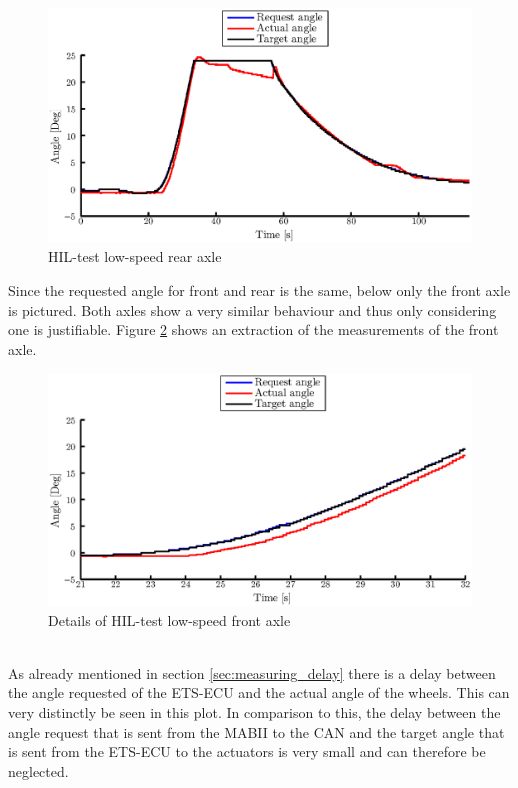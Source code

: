 \documentclass[ExampleMasters.tex]{subfiles}
\begin{document}
\begin{figure}[!htb]
	\centering
	\includegraphics[width=1\linewidth]{figures/HIL002_rear}
	\caption{\acrlong{HIL}-test low-speed rear axle}
	
	\label{fig:HIL002_rear}
\end{figure}
Since the requested angle for front and rear is the same, below only the front axle is pictured. Both axles show a very similar behaviour and thus only considering one is justifiable.
Figure \ref{fig:HIL002_front_closeup} shows an extraction of the measurements of the front axle. 
\begin{figure}[!htb]
	\centering
	\includegraphics[width=1\linewidth]{figures/HIL002_front_closeup}
	\caption{Details of \acrlong{HIL}-test low-speed front axle}
	
	\label{fig:HIL002_front_closeup}
\end{figure} \\
As already mentioned in section \ref{sec:measuring_delay} there is a delay between the angle requested of the \gls{ETS}-\gls{ECU} and the actual angle of the wheels. This can very distinctly be seen in this plot. In comparison to this, the delay between the angle request that is sent from the \gls{MABII} to the \gls{CAN} and the target angle that is sent from the \gls{ETS}-\gls{ECU} to the actuators is very small and can therefore be neglected.\\
\end{document}
